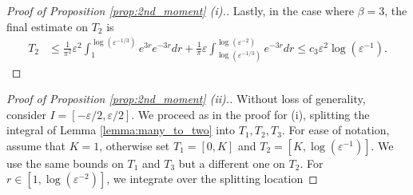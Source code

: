 \documentclass{article}
\theoremstyle{definition}
\numberwithin{equation}{section}
\numberwithin{thm}{section}
\newcommand*{\eps}{\ensuremath{\varepsilon}}            %
\begin{document}
\begin{proof}[Proof of Proposition \ref{prop:2nd_moment} (i).]
Lastly, in the case where $\beta=3$, the final estimate on $T_2$ is 
\begin{align}
    T_2 &\leq \frac{1}{\pi^2}\eps^2\int_1^{\log(\eps^{-1/3})} e^{3r}e^{-3 r}dr + \frac{1}{\pi}\eps\int_{\log(\eps^{-1/3})}^{\log(\eps^{-2})}e^{-3 r}dr \nonumber\leq c_3 \eps^2 \log(\eps^{-1}). 
\end{align}
\end{proof}

\begin{proof}[Proof of Proposition \ref{prop:2nd_moment} (ii).]
    Without loss of generality, consider $I=[-\eps/2,\eps/2]$. 
    We proceed as in the proof for (i), splitting the integral of Lemma \ref{lemma:many_to_two} into $T_1,T_2,T_3$. For ease of notation, assume that $K=1$, otherwise set $T_1=[0,K]$ and $T_2=[K,\log(\eps^{-1})]$. We use the same bounds on $T_1$ and $T_3$ but a different one on $T_2$. For $r\in [1,\log(\eps^{-2})]$, we integrate over the splitting location


\end{proof}
\end{document}
